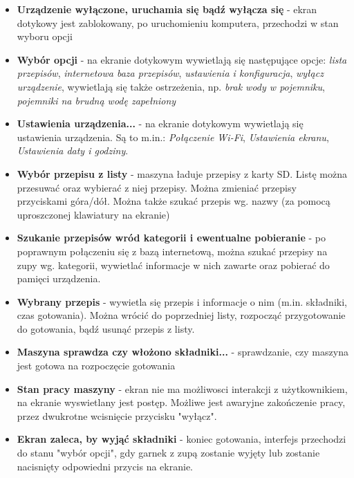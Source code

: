 \documentclass[12pt,a4paper,notitlepage]{article}
\begin{document}
\begin{itemize}

\item \textbf{Urządzenie wyłączone, uruchamia się bądź wyłącza się} - ekran dotykowy jest zablokowany, po uruchomieniu komputera, przechodzi w stan wyboru opcji
\item \textbf{Wybór opcji} - na ekranie dotykowym wywietlają się następujące opcje: \emph{lista przepisów}, \emph{internetowa baza przepisów}, \emph{ustawienia i konfiguracja}, \emph{wyłącz urządzenie}, wywietlają się także ostrzeżenia, np. \emph{brak wody w pojemniku}, \emph{pojemniki na brudną wodę zapełniony} 
\item \textbf{Ustawienia urządzenia...} - na ekranie dotykowym wywietlają się ustawienia urządzenia. Są to m.in.: \emph{Połączenie Wi-Fi}, \emph{Ustawienia ekranu}, \emph{Ustawienia daty i godziny}.
\item \textbf{Wybór przepisu z listy} - maszyna ładuje przepisy z karty SD. Listę można przesuwać oraz wybierać z niej przepisy. Można zmieniać przepisy przyciskami góra/dół. Można także szukać przepis wg. nazwy (za pomocą uproszczonej klawiatury na ekranie)
\item \textbf{Szukanie przepisów wród kategorii i ewentualne pobieranie} - po poprawnym połączeniu się z bazą internetową, można szukać przepisy na zupy wg. kategorii, wywietlać informacje w nich zawarte oraz pobierać do pamięci urządzenia. 
\item \textbf{Wybrany przepis} - wywietla się przepis i informacje o nim (m.in. składniki, czas gotowania). Można wrócić do poprzedniej listy, rozpocząć przygotowanie do gotowania, bądź usunąć przepis z listy.
\item \textbf{Maszyna sprawdza czy włożono składniki...} - sprawdzanie, czy maszyna jest gotowa na rozpoczęcie gotowania
\item \textbf{Stan pracy maszyny} - ekran nie ma możliwosci interakcji z użytkownikiem, na ekranie wyswietlany jest postęp. Możliwe jest awaryjne zakończenie pracy, przez dwukrotne wcisnięcie przycisku "wyłącz".
\item \textbf{Ekran zaleca, by wyjąć składniki} - koniec gotowania, interfejs przechodzi do stanu "wybór opcji", gdy garnek z zupą zostanie wyjęty lub zostanie nacisnięty odpowiedni przycis na ekranie.

\end{itemize}
\end{document}
